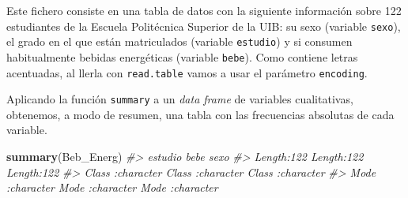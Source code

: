 \documentclass[
]{book}
\newenvironment{Shaded}{\begin{snugshade}}{\end{snugshade}}
\newcommand{\CommentTok}[1]{\textcolor[rgb]{0.56,0.35,0.01}{\textit{#1}}}
\newcommand{\DataTypeTok}[1]{\textcolor[rgb]{0.13,0.29,0.53}{#1}}
\newcommand{\KeywordTok}[1]{\textcolor[rgb]{0.13,0.29,0.53}{\textbf{#1}}}
\newcommand{\NormalTok}[1]{#1}
\newcommand{\OtherTok}[1]{\textcolor[rgb]{0.56,0.35,0.01}{#1}}
\newcommand{\StringTok}[1]{\textcolor[rgb]{0.31,0.60,0.02}{#1}}
\theoremstyle{definition}
\theoremstyle{definition}
\theoremstyle{definition}
\theoremstyle{remark}
\begin{document}
Este fichero consiste en una tabla de datos con la siguiente información sobre 122 estudiantes de la Escuela Politécnica Superior de la UIB: su sexo (variable \texttt{sexo}), el grado en el que están matriculados
(variable \texttt{estudio}) y si consumen habitualmente bebidas energéticas (variable \texttt{bebe}). Como contiene letras acentuadas, al llerla con \texttt{read.table} vamos a usar el parámetro \texttt{encoding}.

\begin{Shaded}
\end{Shaded}

Aplicando la función \texttt{summary} a un \emph{data frame} de variables cualitativas, obtenemos, a modo de resumen, una tabla con las frecuencias absolutas de cada variable.

\begin{Shaded}
\begin{Highlighting}[]
\KeywordTok{summary}\NormalTok{(Beb\_Energ)}
\CommentTok{\#\textgreater{}    estudio              bebe               sexo          }
\CommentTok{\#\textgreater{}  Length:122         Length:122         Length:122        }
\CommentTok{\#\textgreater{}  Class :character   Class :character   Class :character  }
\CommentTok{\#\textgreater{}  Mode  :character   Mode  :character   Mode  :character}
\end{Highlighting}
\end{Shaded}
\end{document}

